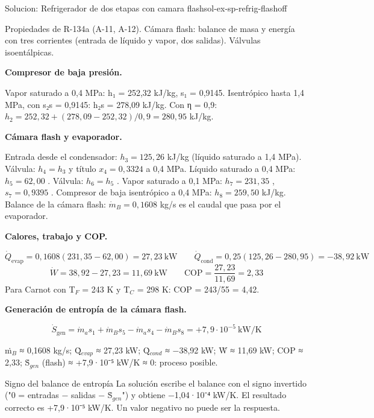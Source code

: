 \documentclass[11pt,a4paper]{article}
\begin{document}
\begin{ocg}{Solucion: Refrigerador de dos etapas con camara flash}{sol-ex-sp-refrig-flash}{off}
\begin{antesbox}
Propiedades de R-134a (A-11, A-12). Cámara flash: balance de masa y energía con tres corrientes (entrada de líquido y vapor, dos salidas). Válvulas isoentálpicas.
\end{antesbox}

\par\medskip\noindent\textbf{Compresor de baja presión.}\par
Vapor saturado a 0,4 MPa: h₁ = 252,32 kJ/kg, s₁ = 0,9145. Isentrópico hasta 1,4 MPa, con s₂s = 0,9145: h₂s = 278,09 kJ/kg. Con η = 0,9:  $h_2 = 252{,}32 + (278{,}09 - 252{,}32)/0{,}9 = 280{,}95$  kJ/kg.

\par\medskip\noindent\textbf{Cámara flash y evaporador.}\par
Entrada desde el condensador:  $h_3 = 125{,}26$  kJ/kg (líquido saturado a 1,4 MPa). Válvula:  $h_4 = h_3$  y título  $x_4 = 0{,}3324$  a 0,4 MPa. Líquido saturado a 0,4 MPa:  $h_5 = 62{,}00$ . Válvula:  $h_6 = h_5$ . Vapor saturado a 0,1 MPa:  $h_7 = 231{,}35$ ,  $s_7 = 0{,}9395$ . Compresor de baja isentrópico a 0,4 MPa:  $h_8 = 259{,}50$  kJ/kg. Balance de la cámara flash:  $\dot m_B = 0{,}1608$  kg/s es el caudal que pasa por el evaporador.

\par\medskip\noindent\textbf{Calores, trabajo y COP.}\par
\[\dot Q_{\text{evap}} = 0{,}1608(231{,}35 - 62{,}00) = 27{,}23\ \text{kW} \qquad \dot Q_{\text{cond}} = 0{,}25(125{,}26 - 280{,}95) = -38{,}92\ \text{kW}\]   \[\dot W = 38{,}92 - 27{,}23 = 11{,}69\ \text{kW} \qquad \mathrm{COP} = \frac{27{,}23}{11{,}69} = 2{,}33\]  Para Carnot con T$_{F}$ = 243 K y T$_{C}$ = 298 K: COP = 243/55 = 4,42.

\par\medskip\noindent\textbf{Generación de entropía de la cámara flash.}\par
\[\dot S_{\text{gen}} = \dot m_a s_1 + \dot m_B s_5 - \dot m_a s_4 - \dot m_B s_8 = +7{,}9\cdot 10^{-5}\ \text{kW/K}\]

\begin{resbox}
ṁ$_{B}$ ≈ 0,1608 kg/s; Q̇$_{evap}$ ≈ 27,23 kW; Q̇$_{cond}$ ≈ −38,92 kW; Ẇ ≈ 11,69 kW; COP ≈ 2,33; Ṡ$_{gen}$ (flash) ≈ +7,9·10⁻⁵ kW/K ≈ 0: proceso posible.
\end{resbox}

\begin{ojobox}{Signo del balance de entropía}
La solución escribe el balance con el signo invertido ("0 = entradas − salidas − Ṡ$_{gen}$") y obtiene −1,04·10⁻⁴ kW/K. El resultado correcto es +7,9·10⁻⁵ kW/K. Un valor negativo no puede ser la respuesta.
\end{ojobox}

\hspace{0pt}\end{ocg}
\end{document}
